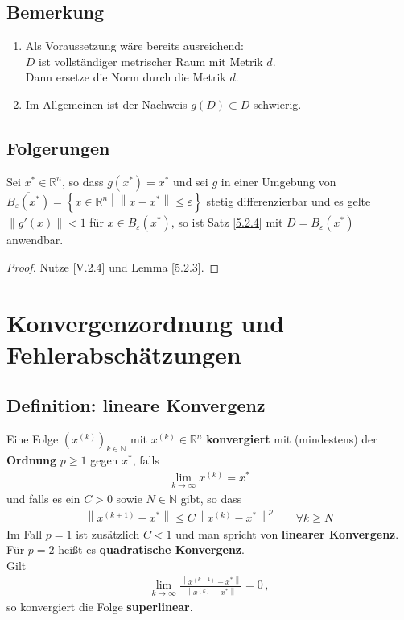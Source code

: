\documentclass[ngerman,fontsize=11pt, paper=a4, parskip=half, titlepage=true, toc=bib]{scrbook}
\newcommand{\R}{\mathds{R}}
\newcommand{\N}{\mathds{N}}
\newcommand{\nn}[1]{\left\| #1 \right\|}
\newcommand{\sectione}[1]{\section{#1} \setcounter{equation}{0}}
\begin{document}
  \subsection{Bemerkung}\label{5.2.5}
  \begin{enumerate}[1)]
  \item Als Voraussetzung wäre bereits ausreichend:\\
    $D$ ist vollständiger metrischer Raum mit Metrik $d$. \\
    Dann ersetze die Norm durch die Metrik $d$.
  \item Im Allgemeinen ist der Nachweis $g(D)\subset D$ schwierig.
  \end{enumerate}
  
  
  
  \subsection{Folgerungen}\label{5.2.6}
  Sei $x^{*}\in \R^n$, so dass $g(x^{*})=x^{*}$ und sei $g$ in einer Umgebung von 
  $\overline{B_\varepsilon(x^{*})}=\left\{ x\in \R^n \middle\vert \nn{x-x^{*}}\leq \varepsilon \right\}$ stetig differenzierbar und es gelte $\nn{g'(x)}<1$ für $x\in \overline{B_\varepsilon(x^{*})}$,
  so ist Satz \ref{5.2.4} mit $D=\overline{B_\varepsilon(x^{*})}$ anwendbar.
  
  \begin{proof}
    Nutze \eqref{V.2.4} und Lemma \ref{5.2.3}.
  \end{proof}
  
  \sectione{Konvergenzordnung und Fehlerabschätzungen}
  
  \subsection{Definition: lineare Konvergenz}\label{5.3.1}
  Eine Folge $(x^{(k)})_{k\in\N} $ mit $x^{(k)}\in\R^n$ \textbf{konvergiert} mit (mindestens)
  der \textbf{Ordnung} $p\geq 1$ gegen $x^{*}$, falls
  \begin{gather*}
    \lim\limits_{k\rightarrow \infty}x^{(k)}=x^{*}
  \end{gather*}
  und falls es ein $C>0$ sowie $N\in\N$ gibt, so dass
  \begin{gather*}
    \nn{x^{(k+1)}-x^{*}} \leq C \nn{x^{(k)}-x^{*}}^p\qquad \forall k\geq N 
  \end{gather*}
  Im Fall $p=1$ ist zusätzlich $C<1$ und man spricht von \textbf{linearer Konvergenz}. \\
  Für $p=2$ heißt es \textbf{quadratische Konvergenz}.
  \\Gilt 
  \begin{gather*} 
    \lim\limits_{k\rightarrow \infty}\frac{\nn{x^{(k+1)}-x^{*}}}{\nn{x^{(k)}-x^{*}}} = 0\, ,
  \end{gather*} so konvergiert die Folge \textbf{superlinear}.
\end{document}
